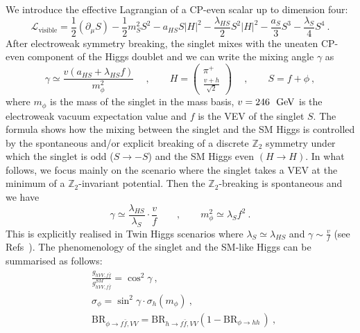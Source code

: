 We introduce the effective Lagrangian of a CP-even scalar up to dimension four:
\begin{equation}
\mathcal{L}_{\text{visible}}=\frac{1}{2}(\partial_\mu S)-\frac{1}{2} m_S^2 S^2-a_{HS} S\vert H\vert^2-\frac{\lambda_{HS}}{2} S^2\vert H\vert^2-\frac{a_S}{3} S^3-\frac{\lambda_S}{4} S^4\ .\label{eq:everybody}
\end{equation}
After electroweak symmetry breaking, the singlet mixes with the uneaten CP-even component of the Higgs doublet and we can write the mixing angle $\gamma$ as
\begin{equation}
\gamma\simeq\frac{v(a_{HS}+\lambda_{HS} f)}{m_\phi^2}\quad\ ,\qquad H=\begin{pmatrix}\pi^+\\ \frac{v+h}{\sqrt{2}}\end{pmatrix}\quad\ ,\qquad S=f+\phi\ ,
\end{equation}   
where $m_\phi$ is the mass of the singlet in the mass basis, $v=246\text{ \ensuremath{~\text{GeV}}}$ is the electroweak vacuum expectation value and $f$ is the VEV of the singlet $S$. The formula shows how the mixing between the singlet and the SM Higgs is controlled by the spontaneous and/or explicit breaking of a discrete $\mathbb{Z}_2$ symmetry under which the singlet is odd ($S\to -S$) and the SM Higgs even $(H\to H)$.  In what follows, we focus mainly on the scenario where the singlet takes a VEV at the minimum of a $\mathbb{Z}_2$-invariant potential. Then the $\mathbb{Z}_2$-breaking is spontaneous and we have
\begin{equation}
\gamma\simeq \frac{\lambda_{HS}}{\lambda_S}\cdot\frac{v}{f}\qquad ,\qquad m_\phi^2\simeq \lambda_S f^2\ . \label{eq:mixing}
\end{equation} 
 This is explicitly realised in Twin Higgs scenarios where $\lambda_S\simeq \lambda_{HS}$ and $\gamma\sim \frac{v}{f}$ (see Refs~\cite{Chacko:2005pe,Barbieri:2005ri}). The phenomenology of the singlet and the SM-like Higgs can be summarised as follows:
\begin{align}
&\frac{g_{hVV,f\bar f}}{g_{hVV,f\bar f}^{SM}}=\cos^2\gamma \label{eq:SMHiggs}\ ,\\
&\sigma_\phi=\sin^2\gamma\cdot \sigma_{h}(m_\phi)\label{eq:Sproduction}\ ,\\
&\text{BR}_{\phi\to f\bar{f},VV}=\text{BR}_{h\to f\bar{f},VV}(1-\text{BR}_{\phi\to hh\ \label{eq:SBR}
})\ ,
\end{align}
